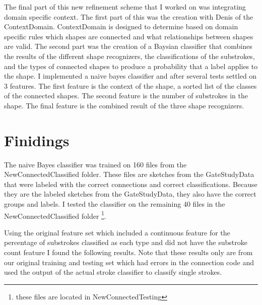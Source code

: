 \documentclass{article}
\begin{document}
The final part of this new refinement scheme that I worked on was integrating domain specific context.  The first part of this was the creation with Denis of the ContextDomain.  ContextDomain is designed to determine based on domain specific rules which shapes are connected and what relationships between shapes are valid.  The second part was the creation of a Baysian classifier that combines the results of the different shape recognizers, the classifications of the substrokes, and the types of connected shapes to produce a probability that a label applies to the shape.  I implemented a naive bayes classifier and after several tests settled on 3 features.  The first feature is the context of the shape, a sorted list of the classes of the connected shapes.  The second feature is the number of substrokes in the shape.  The final feature is the combined result of the three shape recognizers.

\section{Finidings}
The naive Bayes classifier was trained on 160 files from the NewConnectedClassified folder.  These files are sketches from the GateStudyData that were labeled with the correct connections and correct classifications.  Because they are the labeled sketches from the GateStudyData, they also have the correct groups and labels.  I tested the classifier on the remaining 40 files in the NewConnectedClassified folder \footnote{these files are located in NewConnectedTesting}.  

Using the original feature set which included a continuous feature for the percentage of substrokes classified as each type and did not have the substroke count feature I found the following results.  Note that these results only are from our original training and testing set which had errors in the connection code and used the output of the actual stroke classifier to classify single strokes.
\end{document}
